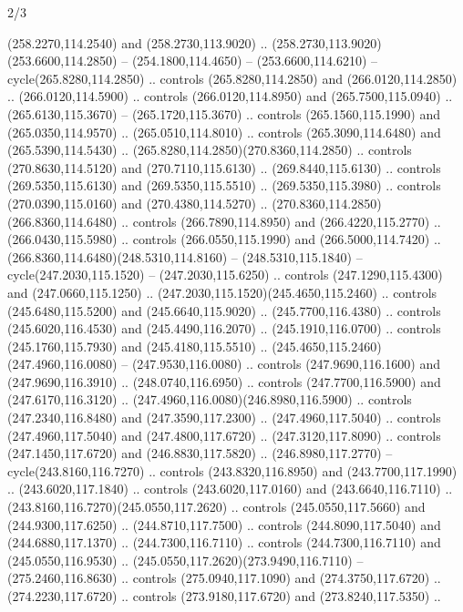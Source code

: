 \begin{flagdescription}{2/3}
\begin{scope}[xshift=0.5\flaglength,yshift=0.5\flagwidth,scale=\flagwidth/259.2]
\begin{scope}[y=0.8pt, x=0.8pt, yscale=-1,shift={(-243,-162)}]
      (258.2270,114.2540) and (258.2730,113.9020) ..
      (258.2730,113.9020)(253.6600,114.2850) -- (254.1800,114.4650) --
      (253.6600,114.6210) -- cycle(265.8280,114.2850) .. controls
      (265.8280,114.2850) and (266.0120,114.2850) .. (266.0120,114.5900) .. controls
      (266.0120,114.8950) and (265.7500,115.0940) .. (265.6130,115.3670) --
      (265.1720,115.3670) .. controls (265.1560,115.1990) and (265.0350,114.9570) ..
      (265.0510,114.8010) .. controls (265.3090,114.6480) and (265.5390,114.5430) ..
      (265.8280,114.2850)(270.8360,114.2850) .. controls (270.8630,114.5120) and
      (270.7110,115.6130) .. (269.8440,115.6130) .. controls (269.5350,115.6130) and
      (269.5350,115.5510) .. (269.5350,115.3980) .. controls (270.0390,115.0160) and
      (270.4380,114.5270) .. (270.8360,114.2850)(266.8360,114.6480) .. controls
      (266.7890,114.8950) and (266.4220,115.2770) .. (266.0430,115.5980) .. controls
      (266.0550,115.1990) and (266.5000,114.7420) ..
      (266.8360,114.6480)(248.5310,114.8160) -- (248.5310,115.1840) --
      cycle(247.2030,115.1520) -- (247.2030,115.6250) .. controls
      (247.1290,115.4300) and (247.0660,115.1250) ..
      (247.2030,115.1520)(245.4650,115.2460) .. controls (245.6480,115.5200) and
      (245.6640,115.9020) .. (245.7700,116.4380) .. controls (245.6020,116.4530) and
      (245.4490,116.2070) .. (245.1910,116.0700) .. controls (245.1760,115.7930) and
      (245.4180,115.5510) .. (245.4650,115.2460)(247.4960,116.0080) --
      (247.9530,116.0080) .. controls (247.9690,116.1600) and (247.9690,116.3910) ..
      (248.0740,116.6950) .. controls (247.7700,116.5900) and (247.6170,116.3120) ..
      (247.4960,116.0080)(246.8980,116.5900) .. controls (247.2340,116.8480) and
      (247.3590,117.2300) .. (247.4960,117.5040) .. controls (247.4960,117.5040) and
      (247.4800,117.6720) .. (247.3120,117.8090) .. controls (247.1450,117.6720) and
      (246.8830,117.5820) .. (246.8980,117.2770) -- cycle(243.8160,116.7270) ..
      controls (243.8320,116.8950) and (243.7700,117.1990) .. (243.6020,117.1840) ..
      controls (243.6020,117.0160) and (243.6640,116.7110) ..
      (243.8160,116.7270)(245.0550,117.2620) .. controls (245.0550,117.5660) and
      (244.9300,117.6250) .. (244.8710,117.7500) .. controls (244.8090,117.5040) and
      (244.6880,117.1370) .. (244.7300,116.7110) .. controls (244.7300,116.7110) and
      (245.0550,116.9530) .. (245.0550,117.2620)(273.9490,116.7110) --
      (275.2460,116.8630) .. controls (275.0940,117.1090) and (274.3750,117.6720) ..
      (274.2230,117.6720) .. controls (273.9180,117.6720) and (273.8240,117.5350) ..

\end{scope}
\end{scope}
\end{flagdescription}
